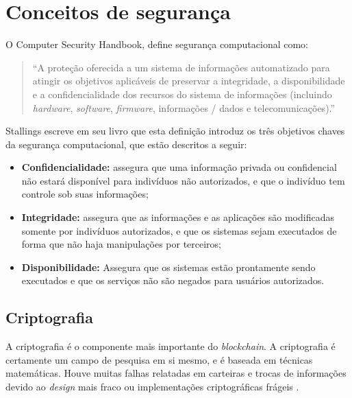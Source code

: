 \section{Conceitos de segurança}

    O Computer Security Handbook\cite{nist95}, define segurança computacional como:
    
     \begin{quote}
        ``A proteção oferecida a um sistema de informações automatizado para atingir os objetivos aplicáveis de preservar a integridade, a disponibilidade e a confidencialidade dos recursos do sistema de informações (incluindo \textit{hardware}, \textit{software}, \textit{firmware}, informações / dados e telecomunicações).''
     \end{quote}
     
     Stallings escreve em seu livro \cite{cryptograpy_and_network_stallings} que esta definição introduz os três objetivos chaves da segurança computacional, que estão descritos a seguir:
        
        \begin{itemize}
            \item \textbf{Confidencialidade:} assegura que uma informação privada ou confidencial não estará disponível para indivíduos não autorizados, e que o indivíduo tem controle sob suas informações;
            \item \textbf{Integridade:} assegura que as informações e as aplicações são modificadas somente por indivíduos autorizados, e que os sistemas sejam executados de forma que não haja manipulações por terceiros;
            \item \textbf{Disponibilidade:} Assegura que os sistemas estão prontamente sendo executados e que os serviços não são negados para usuários autorizados.
        \end{itemize}

    \subsection{Criptografia}
    
    A criptografia é o componente mais importante do \textit{blockchain}. A criptografia é certamente um campo de pesquisa em si mesmo, e é baseada em técnicas matemáticas. Houve muitas falhas relatadas em carteiras e trocas de informações devido ao \textit{design} mais fraco ou implementações criptográficas frágeis \cite{beginnig_blockchain_bikramaditya}.
    
